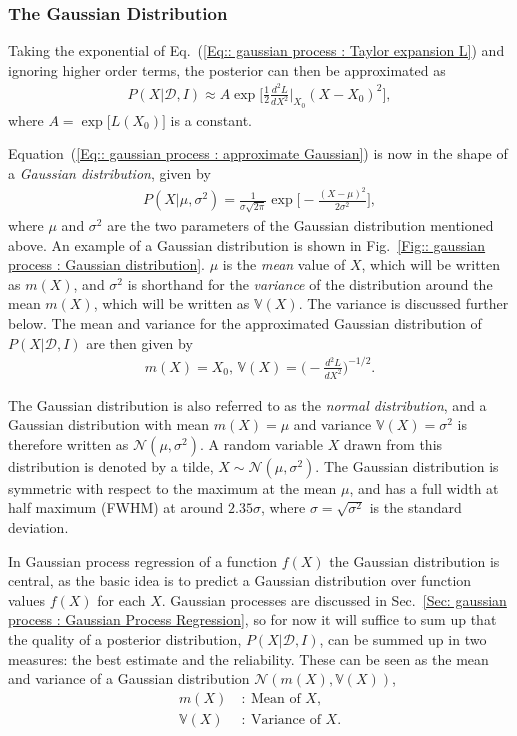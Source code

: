 \documentclass[twoside,english]{uiofysmaster}
\begin{document}
\subsubsection{The Gaussian Distribution}\label{Sec:: gaussian process : The Gaussian Distribution}

Taking the exponential of Eq.~(\ref{Eq:: gaussian process : Taylor expansion L}) and ignoring higher order terms, the posterior can then be approximated as
\begin{align}\label{Eq:: gaussian process : approximate Gaussian}
P(X | \mathcal{D}, I) \approx A \exp \Bigg[ \frac{1}{2} \frac{d^2L}{dX^2}\Big|_{X_0} (X-X_0)^2 \Bigg], 
\end{align} 
where $A = \exp \big[L(X_0) \big]$ is a constant. 

Equation~(\ref{Eq:: gaussian process : approximate Gaussian}) is now in the shape of a \textit{Gaussian distribution}, given by
\begin{align}
P(X| \mu, \sigma^2) = \frac{1}{\sigma \sqrt{2 \pi}} \exp \Bigg[ - \frac{(X- \mu)^2}{2 \sigma^2} \Bigg],
\end{align}
where $\mu$ and $\sigma^2$ are the two parameters of the Gaussian distribution mentioned above. An example of a Gaussian distribution is shown in Fig.~\ref{Fig:: gaussian process : Gaussian distribution}. $\mu$ is the \textit{mean} value of $X$, which will be written as $ m(X)$, and $\sigma^2$ is shorthand for the \textit{variance} of the distribution around the mean $m(X)$, which will be written as $\mathbb{V}(X)$. The variance is discussed further below. The mean and variance for the approximated Gaussian distribution of $P(X|\mathcal{D}, I)$ are then given by
\begin{align}
m(X) = X_0\text{, } \mathbb{V}(X) = \Big( - \frac{d^2L}{dX^2} \Big)^{-1/2}.
\end{align}

The Gaussian distribution is also referred to as the \textit{normal distribution}, and a Gaussian distribution with mean $m(X)= \mu$ and variance $\mathbb{V}(X)=\sigma^2$ is therefore written as $\mathcal{N}(\mu, \sigma^2)$. A random variable $X$ drawn from this distribution is denoted by a tilde, $X \sim \mathcal{N}(\mu, \sigma^2)$. The Gaussian distribution is symmetric with respect to the maximum at the mean $\mu$, and has a full width at half maximum (FWHM) at around $2.35 \sigma$, where $\sigma = \sqrt{\sigma^2}$ is the standard deviation.  

In Gaussian process regression of a function $f(X)$ the Gaussian distribution is central, as the basic idea is to predict a Gaussian distribution over function values $f(X)$ for each $X$. Gaussian processes are discussed in Sec.~\ref{Sec: gaussian process : Gaussian Process Regression}, so for now it will suffice to sum up that the quality of a posterior distribution, $P(X| \mathcal{D}, I)$, can be summed up in two measures: the best estimate and the reliability. These can be seen as the mean and variance of a Gaussian distribution $\mathcal{N}(m(X), \mathbb{V}(X))$,
\begin{align}
m(X)~&:~ \text{Mean of }X,\\
\mathbb{V}(X)~&:~ \text{Variance of }X.
\end{align}
\end{document}
